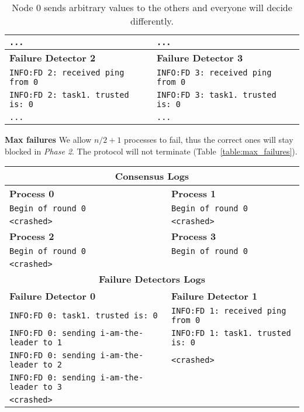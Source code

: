 \documentclass[a4paper]{article}
\begin{document}
\begin{compactitem}
\begin{table}[H]
\begin{tabular}{ll}
		\verb|...| & \verb|...| \\
        \midrule
		\textbf{Failure Detector 2} & \textbf{Failure Detector 3} \\
		\midrule
        \verb|INFO:FD 2: received ping from 0| & \verb|INFO:FD 3: received ping from 0| \\
		\verb|INFO:FD 2: task1. trusted is: 0| & \verb|INFO:FD 3: task1. trusted is: 0| \\
		\verb|...| & \verb|...| \\
        \bottomrule
        \end{tabular}
        \caption{\small{Node $0$ sends arbitrary values to the others and everyone will decide differently.}}
        \label{table:not_byzantine}
	\end{table}
  \item \textbf{Max failures} We allow $n/2 + 1$ processes to fail, thus the correct ones will stay blocked in \emph{Phase 2}. The protocol will not terminate (Table~\ref{table:max_failures}).
  	\begin{table}[H]
		\centering\scriptsize
        \begin{tabular}{ll}
		\toprule
        \multicolumn{2}{c}{\textbf{Consensus Logs}} \\
        \midrule
		\textbf{Process 0} & \textbf{Process 1} \\
		\midrule
        \verb|Begin of round 0| & \verb|Begin of round 0| \\
		\verb|<crashed>| & \verb|<crashed>| \\
        \midrule
		\textbf{Process 2} & \textbf{Process 3} \\
		\midrule
        \verb|Begin of round 0| & \verb|Begin of round 0| \\
		\verb|<crashed>| & \\
        \bottomrule\toprule
		\multicolumn{2}{c}{\textbf{Failure Detectors Logs}} \\
		\midrule
		\textbf{Failure Detector 0} & \textbf{Failure Detector 1} \\
		\midrule
		\verb|INFO:FD 0: task1. trusted is: 0| & \verb|INFO:FD 1: received ping from 0| \\
		\verb|INFO:FD 0: sending i-am-the-leader to 1| & \verb|INFO:FD 1: task1. trusted is: 0| \\
		\verb|INFO:FD 0: sending i-am-the-leader to 2| & \verb|<crashed>|\\
		\verb|INFO:FD 0: sending i-am-the-leader to 3| & \\
		\verb|<crashed>| & \\

\end{tabular}
\end{table}
\end{compactitem}
\end{document}
